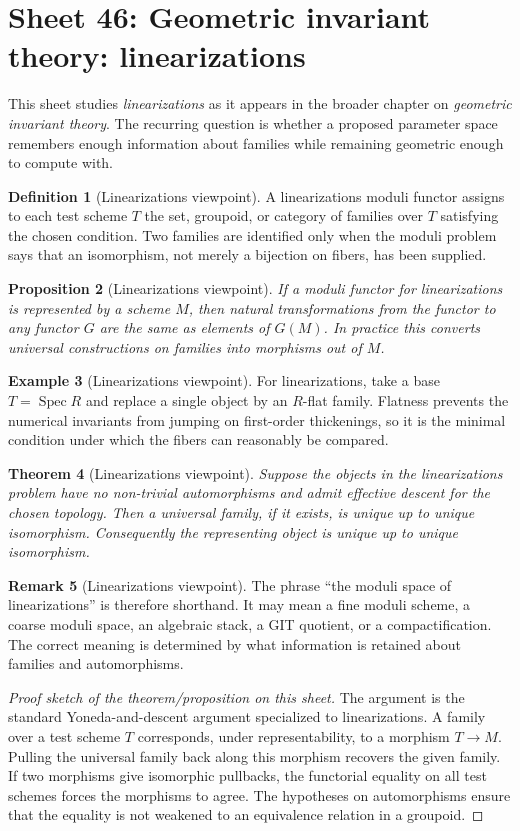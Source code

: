 \documentclass[11pt]{amsart}
\newtheorem{theorem}{Theorem}[section]
\newtheorem{proposition}[theorem]{Proposition}
\theoremstyle{definition}
\newtheorem{definition}[theorem]{Definition}
\newtheorem{example}[theorem]{Example}
\newtheorem{remark}[theorem]{Remark}
\newcommand{\Spec}{\operatorname{Spec}}
\begin{document}
\section{Sheet 46: Geometric invariant theory: linearizations}
This sheet studies \emph{linearizations} as it appears in the broader chapter on \emph{geometric invariant theory}.  The recurring question is whether a proposed parameter space remembers enough information about families while remaining geometric enough to compute with.
\begin{definition}[Linearizations viewpoint]
A linearizations moduli functor assigns to each test scheme $T$ the set, groupoid, or category of families over $T$ satisfying the chosen condition.  Two families are identified only when the moduli problem says that an isomorphism, not merely a bijection on fibers, has been supplied.
\end{definition}
\begin{proposition}[Linearizations viewpoint]
If a moduli functor for linearizations is represented by a scheme $M$, then natural transformations from the functor to any functor $G$ are the same as elements of $G(M)$.  In practice this converts universal constructions on families into morphisms out of $M$.
\end{proposition}
\begin{example}[Linearizations viewpoint]
For linearizations, take a base $T=\Spec R$ and replace a single object by an $R$-flat family.  Flatness prevents the numerical invariants from jumping on first-order thickenings, so it is the minimal condition under which the fibers can reasonably be compared.
\end{example}
\begin{theorem}[Linearizations viewpoint]
Suppose the objects in the linearizations problem have no non-trivial automorphisms and admit effective descent for the chosen topology.  Then a universal family, if it exists, is unique up to unique isomorphism.  Consequently the representing object is unique up to unique isomorphism.
\end{theorem}
\begin{remark}[Linearizations viewpoint]
The phrase ``the moduli space of linearizations'' is therefore shorthand.  It may mean a fine moduli scheme, a coarse moduli space, an algebraic stack, a GIT quotient, or a compactification.  The correct meaning is determined by what information is retained about families and automorphisms.
\end{remark}
\begin{proof}[Proof sketch of the theorem/proposition on this sheet]
The argument is the standard Yoneda-and-descent argument specialized to linearizations.  A family over a test scheme $T$ corresponds, under representability, to a morphism $T\to M$.  Pulling the universal family back along this morphism recovers the given family.  If two morphisms give isomorphic pullbacks, the functorial equality on all test schemes forces the morphisms to agree.  The hypotheses on automorphisms ensure that the equality is not weakened to an equivalence relation in a groupoid.
\end{proof}
\end{document}
